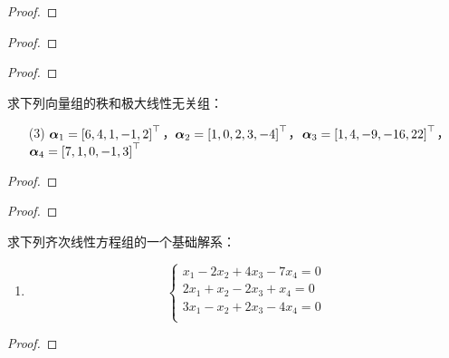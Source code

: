 \begin{problem}

\end{problem}
\begin{proof}

\end{proof}

\begin{problem}

\end{problem}
\begin{proof}

\end{proof}

\begin{problem}

\end{problem}
\begin{proof}

\end{proof}

\begin{problem}
求下列向量组的秩和极大线性无关组：
\begin{enumerate}
    \item[(3)] \(\boldsymbol{\alpha}_1=\left[ 6,4,1,-1,2 \right]^\top\)，\(\boldsymbol{\alpha}_2=\left[ 1,0,2,3,-4 \right]^\top\)，\(\boldsymbol{\alpha}_3=\left[ 1,4,-9,-16,22 \right]^\top\)，\(\boldsymbol{\alpha}_4=\left[ 7,1,0,-1,3 \right]^\top\)
\end{enumerate}
\end{problem}
\begin{proof}

\end{proof}

\begin{problem}

\end{problem}
\begin{proof}

\end{proof}

\begin{problem}
求下列齐次线性方程组的一个基础解系：
\begin{enumerate}
    \item
          {
          \begin{equation*}
              \begin{cases}
                  x_1-2x_2+4x_3-7x_4=0 \\
                  2x_1+x_2-2x_3+x_4=0  \\
                  3x_1-x_2+2x_3-4x_4=0 \\
              \end{cases}
          \end{equation*}
          }
\end{enumerate}
\end{problem}
\begin{proof}

\end{proof}

